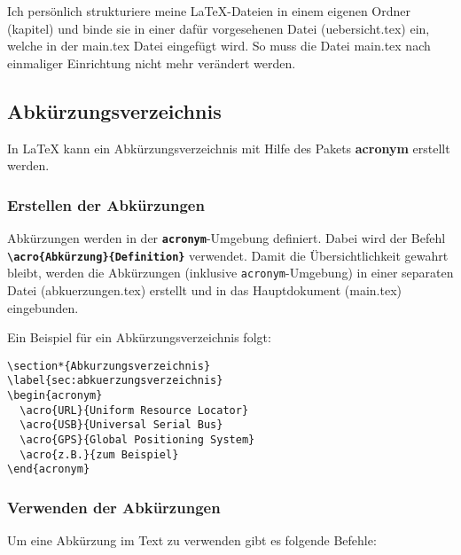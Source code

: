 Ich persönlich strukturiere meine \LaTeX{}-Dateien in einem eigenen Ordner (kapitel) und binde sie in einer dafür vorgesehenen Datei (uebersicht.tex) ein, welche in der main.tex Datei eingefügt wird. So muss die Datei main.tex nach einmaliger Einrichtung nicht mehr verändert werden.


\subsection{Abkürzungsverzeichnis}
\label{sec:abkuerzungsverzeichnis_erklärung}
In \LaTeX{} kann ein Abkürzungsverzeichnis mit Hilfe des Pakets \textbf{acronym} erstellt werden.

\subsubsection{Erstellen der Abkürzungen}
Abkürzungen werden in der \texttt{\textbf{acronym}}-Umgebung definiert. Dabei wird der Befehl \newline \textbf{\texttt{\textbackslash acro\{Abkürzung\}\{Definition\}}} verwendet.
Damit die Übersichtlichkeit gewahrt bleibt, werden die Abkürzungen (inklusive \texttt{acronym}-Umgebung) in einer separaten Datei (abkuerzungen.tex) erstellt und in das Hauptdokument (main.tex) eingebunden.

\newpage
Ein Beispiel für ein Abkürzungsverzeichnis folgt:

\begin{lstlisting}[language={[LaTeX]TeX}]
\section*{Abkurzungsverzeichnis}
\label{sec:abkuerzungsverzeichnis}
\begin{acronym}
  \acro{URL}{Uniform Resource Locator}
  \acro{USB}{Universal Serial Bus}
  \acro{GPS}{Global Positioning System}
  \acro{z.B.}{zum Beispiel}
\end{acronym}
\end{lstlisting}


\subsubsection{Verwenden der Abkürzungen}
Um eine Abkürzung im Text zu verwenden gibt es folgende Befehle:

